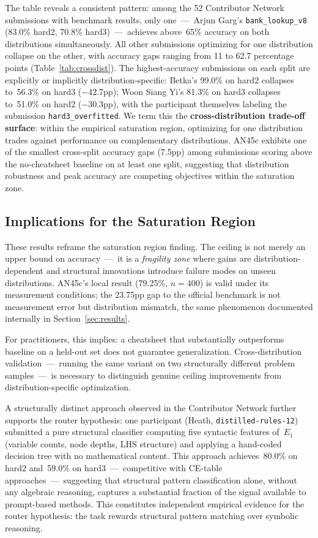 \documentclass[11pt]{article}
\begin{document}
The table reveals a consistent pattern: among the 52 Contributor
Network submissions with benchmark results, only one~---~Arjun Garg's
\texttt{bank\_lookup\_v8} (83.0\% hard2, 70.8\% hard3)~---~achieves
above~65\% accuracy on both distributions simultaneously. All other
submissions optimizing for one distribution collapse on the other, with
accuracy gaps ranging from 11 to 62.7 percentage points
(Table~\ref{tab:crossdist}). The highest-accuracy submissions on each split
are explicitly or implicitly distribution-specific: Betka's 99.0\% on
hard2 collapses to~56.3\% on hard3 ($-$42.7pp); Woon Siang Yi's
81.3\% on hard3 collapses to~51.0\% on hard2 ($-$30.3pp), with the
participant themselves labeling the submission \texttt{hard3\_overfitted}.
We term this the \textbf{cross-distribution trade-off surface}: within
the empirical saturation region, optimizing for one distribution trades
against performance on complementary distributions. AN45c exhibits one
of the smallest cross-split accuracy gaps (7.5pp) among submissions
scoring above the no-cheatsheet baseline on at least one split,
suggesting that distribution robustness and peak accuracy
are competing objectives within the saturation zone.

\subsection{Implications for the Saturation Region}

These results reframe the saturation region finding. The ceiling is not
merely an upper bound on accuracy~---~it is a \emph{fragility zone}
where gains are distribution-dependent and structural innovations
introduce failure modes on unseen distributions. AN45c's local result
(79.25\%, $n=400$) is valid under its measurement conditions; the
23.75pp gap to the official benchmark is not measurement error but
distribution mismatch, the same phenomenon documented internally in
Section~\ref{sec:results}.

For practitioners, this implies: a cheatsheet that substantially
outperforms baseline on a held-out set does not guarantee
generalization. Cross-distribution validation~---~running the same
variant on two structurally different problem samples~---~is necessary
to distinguish genuine ceiling improvements from distribution-specific
optimization.

A structurally distinct approach observed in the Contributor Network
further supports the router hypothesis: one participant (Heath,
\texttt{distilled-rules-12}) submitted a pure structural classifier
computing five syntactic features of~$E_1$ (variable counts, node
depths, LHS structure) and applying a hand-coded decision tree with no
mathematical content. This approach achieves~80.0\% on hard2 and~59.0\%
on hard3~---~competitive with CE-table approaches~---~suggesting that
structural pattern classification alone, without any algebraic
reasoning, captures a substantial fraction of the signal available to
prompt-based methods. This constitutes independent empirical evidence
for the router hypothesis: the task rewards structural pattern matching
over symbolic reasoning.
\end{document}
